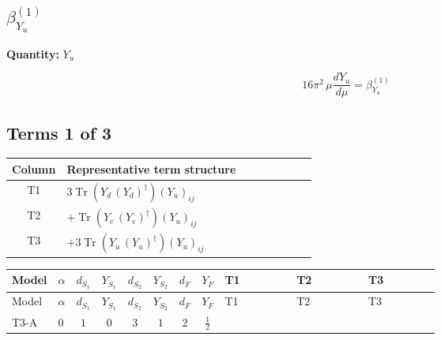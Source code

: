 \documentclass[8pt]{article}
\begin{document}
\begin{landscape}
\section*{$\beta_{Y_u}^{(1)}$}
\noindent\textbf{Quantity: }$Y_u$\par\smallskip
\[16\pi^2\,\mu\frac{d Y_u}{d\mu}=\beta_{Y_u}^{(1)}\]
\subsection*{Terms 1 of 3}
\begin{center}
\begin{tabular}{@{}c >{\raggedright\arraybackslash}p{0.82\linewidth}@{}}
\toprule
Column & Representative term structure \\
\midrule
T1 & \(\displaystyle 3 \operatorname{Tr}\!\left({Y_d}\,\left({Y_d}\right)^{\dagger}\right) \left({Y_u}\right)_{ij}\) \\
\midrule
T2 & \(\displaystyle +\operatorname{Tr}\!\left({Y_e}\,\left({Y_e}\right)^{\dagger}\right) \left({Y_u}\right)_{ij}\) \\
\midrule
T3 & \(\displaystyle +3 \operatorname{Tr}\!\left({Y_u}\,\left({Y_u}\right)^{\dagger}\right) \left({Y_u}\right)_{ij}\) \\
\midrule
\bottomrule
\end{tabular}
\end{center}
\smallskip
\tiny
\begin{longtable}{@{}llcccccc >{\raggedright\arraybackslash}p{0.21\linewidth} >{\raggedright\arraybackslash}p{0.21\linewidth} >{\raggedright\arraybackslash}p{0.21\linewidth}@{}}
\toprule
Model & $\alpha$ & $d_{S_1}$ & $Y_{S_1}$ & $d_{S_2}$ & $Y_{S_2}$ & $d_F$ & $Y_F$ & T1 & T2 & T3 \\
\midrule
\endfirsthead
\toprule
Model & $\alpha$ & $d_{S_1}$ & $Y_{S_1}$ & $d_{S_2}$ & $Y_{S_2}$ & $d_F$ & $Y_F$ & T1 & T2 & T3 \\
\midrule
\endhead
T3-A & $0$ & $1$ & $0$ & $3$ & $1$ & $2$ & $\frac{1}{2}$ & \scriptsize\adjustbox{max width=\linewidth}{$\begin{gathered} 3 \operatorname{Tr}\!\left({Y_d}\,\left({Y_d}\right)^{\dagger}\right) \left({Y_u}\right)_{ij}\end{gathered}$} & \scriptsize\adjustbox{max width=\linewidth}{$\begin{gathered} +\operatorname{Tr}\!\left({Y_e}\,\left({Y_e}\right)^{\dagger}\right) \left({Y_u}\right)_{ij}\end{gathered}$} & \scriptsize\adjustbox{max width=\linewidth}{$\begin{gathered} +3 \operatorname{Tr}\!\left({Y_u}\,\left({Y_u}\right)^{\dagger}\right) \left({Y_u}\right)_{ij}\end{gathered}$} \\

\end{longtable}
\end{landscape}
\end{document}
